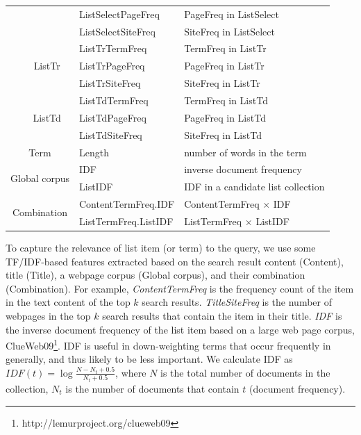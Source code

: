 \begin{table}[!ht]
\begin{tabular}{|c|c|l|l|}
                  &                   &  ListSelectPageFreq           & PageFreq in ListSelect \\ 
                  &                   &  ListSelectSiteFreq           & SiteFreq in ListSelect \\ \cline{2-4} 
                  & \multirow{3}{*}{ListTr} & ListTrTermFreq  & TermFreq in ListTr\\ 
                  &                   &  ListTrPageFreq       & PageFreq in ListTr \\ 
                  &                   &  ListTrSiteFreq       & SiteFreq in ListTr \\ \cline{2-4} 
                  & \multirow{3}{*}{ListTd} & ListTdTermFreq  & TermFreq in ListTd \\ 
                  &                   &  ListTdPageFreq       & PageFreq in ListTd \\ 
                  &                   &  ListTdSiteFreq       & SiteFreq in ListTd \\ \hline
\multicolumn{2}{|c|}{Term}                &  Length & number of words in the term \\ \hline
\multicolumn{2}{|c|}{\multirow{2}{*}{Global corpus}}   & IDF & inverse document frequency \\ 
\multicolumn{2}{|l|}{}                    &  ListIDF  & IDF in a candidate list collection \\  \hline
\multicolumn{2}{|c|}{\multirow{2}{*}{Combination}}   & ContentTermFreq.IDF &  ContentTermFreq $\times$ IDF \\ 
\multicolumn{2}{|l|}{}                    &  ListTermFreq.ListIDF & ListTermFreq $\times$ ListIDF \\  \hline
\end{tabular}
\end{table}
To capture the relevance of list item (or term) to the query, we use some TF/IDF-based features extracted based on the search result content (Content), title (Title), a webpage corpus (Global corpus), and their combination (Combination). 
For example, \textit{ContentTermFreq} is the frequency count of the item in the text content of the top $k$ search results. \textit{TitleSiteFreq} is the number of webpages in the top $k$ search results that contain the item in their title. \textit{IDF} is the inverse document frequency of the list item based on a large web page corpus, ClueWeb09\footnote{http://lemurproject.org/clueweb09}. IDF is useful in down-weighting terms that occur frequently in generally, and thus likely to be less important. We calculate IDF as $IDF(t)=\log{\frac{N-N_{t}+0.5}{N_t+0.5}}$, where $N$ is the total number of documents in the collection, $N_t$ is the number of documents that contain $t$ (document frequency).
